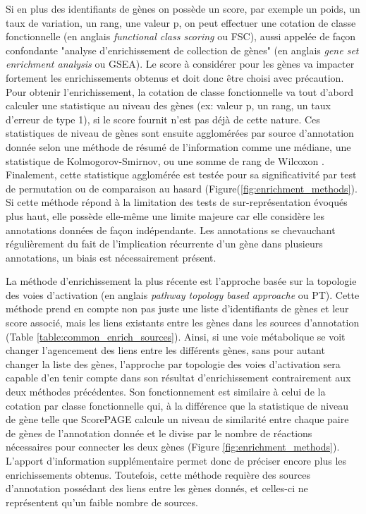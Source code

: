 Si en plus des identifiants de gènes on possède un score, par exemple un poids, un taux de variation, un rang, une valeur p, on peut effectuer une cotation de classe fonctionnelle (en anglais \textit{functional class scoring} ou FSC), aussi appelée de façon confondante "analyse d'enrichissement de collection de gènes" (en anglais \textit{gene set enrichment analysis} ou GSEA). Le score à considérer pour les gènes va impacter fortement les enrichissements obtenus \cite{Ackermann2009Dec} et doit donc être choisi avec précaution. Pour obtenir l'enrichissement, la cotation de classe fonctionnelle va tout d'abord calculer une statistique au niveau des gènes (ex: valeur p, un rang, un taux d'erreur de type 1), si le score fournit n'est pas déjà de cette nature. Ces statistiques de niveau de gènes sont ensuite agglomérées par source d'annotation donnée selon une méthode de résumé de l'information comme une médiane, une statistique de Kolmogorov-Smirnov, ou une somme de rang de Wilcoxon \cite{Khatri2012}. Finalement, cette statistique agglomérée est testée pour sa significativité par test de permutation ou de comparaison au hasard (Figure(\ref{fig:enrichment_methods}). Si cette méthode répond à la limitation des tests de sur-représentation évoqués plus haut, elle possède elle-même une limite majeure car elle considère les annotations données de façon indépendante. Les annotations se chevauchant régulièrement du fait de l'implication récurrente d'un gène dans plusieurs annotations, un biais est nécessairement présent.

La méthode d'enrichissement la plus récente est l'approche basée sur la topologie des voies d'activation (en anglais \textit{pathway topology based approache} ou PT). Cette méthode prend en compte non pas juste une liste d'identifiants de gènes et leur score associé, mais les liens existants entre les gènes dans les sources d'annotation \cite{Khatri2012} (Table \ref{table:common_enrich_sources}). Ainsi, si une voie métabolique se voit changer l'agencement des liens entre les différents gènes, sans pour autant changer la liste des gènes, l'approche par topologie des voies d'activation sera capable d'en tenir compte dans son résultat d'enrichissement contrairement aux deux méthodes précédentes. Son fonctionnement est similaire à celui de la cotation par classe fonctionnelle qui, à la différence que la statistique de niveau de gène telle que ScorePAGE \cite{Rahnenfuhrer2004Jun} calcule un niveau de similarité entre chaque paire de gènes de l'annotation donnée et le divise par le nombre de réactions nécessaires pour connecter les deux gènes (Figure \ref{fig:enrichment_methods}). L'apport d'information supplémentaire permet donc de préciser encore plus les enrichissements obtenus. Toutefois, cette méthode requière des sources d'annotation possédant des liens entre les gènes donnés, et celles-ci ne représentent qu'un faible nombre de sources.

